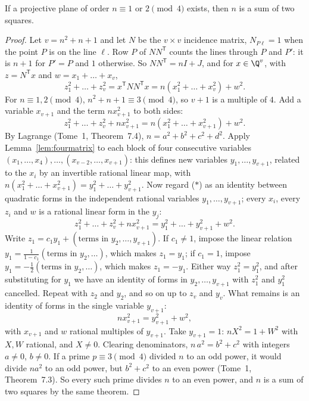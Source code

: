 \begin{theorem}\label{thm:bruckryser}
If a projective plane of order $n\equiv1$ or $2\pmod4$ exists, then $n$ is a sum of two squares.
\end{theorem}
\begin{proof}
Let $v=n^2+n+1$ and let $N$ be the $v\times v$ incidence matrix, $N_{P\ell}=1$ when the point $P$ is on the line $\ell$. Row $P$ of $NN^{\mathsf T}$ counts the lines through $P$ and $P'$: it is $n+1$ for $P'=P$
and $1$ otherwise. So $NN^{\mathsf T}=nI+J$, and for $x\in\Q^v$, with $z=N^{\mathsf T}x$ and $w=x_1+\dots+x_v$,
\[
z_1^2+\dots+z_v^2=x^{\mathsf T}NN^{\mathsf T}x=n(x_1^2+\dots+x_v^2)+w^2.
\]
For $n\equiv1,2\pmod 4$, $n^2+n+1\equiv3\pmod4$, so $v+1$ is a multiple of $4$. Add a variable $x_{v+1}$ and the term $nx_{v+1}^2$ to both sides:
\[
z_1^2+\dots+z_v^2+nx_{v+1}^2=n(x_1^2+\dots+x_{v+1}^2)+w^2.\tag{$*$}
\]
By Lagrange (Tome~1, Theorem~7.4), $n=a^2+b^2+c^2+d^2$. Apply Lemma~\ref{lem:fourmatrix} to each block of four consecutive variables $(x_1,\dots,x_4),\dots,(x_{v-2},\dots,x_{v+1})$: this defines new variables
$y_1,\dots,y_{v+1}$, related to the $x_i$ by an invertible rational linear map, with $n(x_1^2+\dots+x_{v+1}^2)=y_1^2+\dots+y_{v+1}^2$. Now regard ($*$) as an identity between quadratic forms in the
independent rational variables $y_1,\dots,y_{v+1}$; every $x_i$, every $z_i$ and $w$ is a rational linear form in the $y_j$:
\[
z_1^2+\dots+z_v^2+nx_{v+1}^2=y_1^2+\dots+y_{v+1}^2+w^2.
\]
Write $z_1=c_1y_1+(\text{terms in }y_2,\dots,y_{v+1})$. If $c_1\ne1$, impose the linear relation $y_1=\frac1{1-c_1}(\text{terms in }y_2,\dots)$, which makes $z_1=y_1$; if $c_1=1$, impose $y_1=-\frac12(\text{terms in }y_2,\dots)$,
which makes $z_1=-y_1$. Either way $z_1^2=y_1^2$, and after substituting for $y_1$ we have an identity of forms in $y_2,\dots,y_{v+1}$ with $z_1^2$ and $y_1^2$ cancelled. Repeat with $z_2$ and $y_2$, and so on up to
$z_v$ and $y_v$. What remains is an identity of forms in the single variable $y_{v+1}$:
\[
nx_{v+1}^2=y_{v+1}^2+w^2,
\]
with $x_{v+1}$ and $w$ rational multiples of $y_{v+1}$. Take $y_{v+1}=1$: $nX^2=1+W^2$ with $X,W$ rational, and $X\ne0$. Clearing denominators, $n\,a^2=b^2+c^2$ with integers $a\ne0$, $b\ne0$. If a prime $p\equiv3\pmod4$
divided $n$ to an odd power, it would divide $na^2$ to an odd power, but $b^2+c^2$ to an even power (Tome~1, Theorem~7.3). So every such prime divides $n$ to an even power, and $n$ is a sum of two
squares by the same theorem.
\end{proof}


